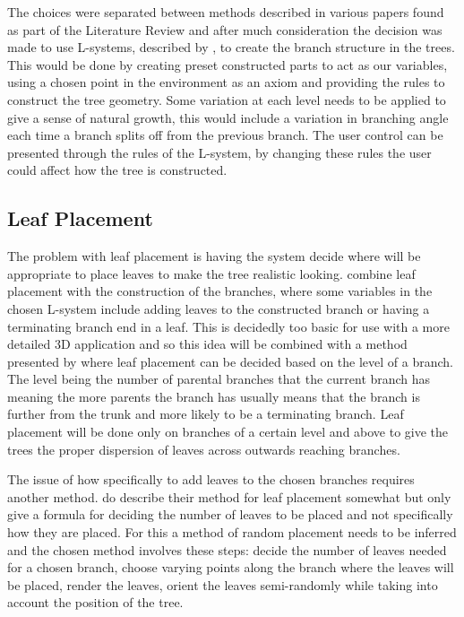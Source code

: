 \documentclass[progress]{cmpreport}
\begin{document}
The choices were separated between methods described in various papers found as part of the 
Literature Review and after much consideration the decision was made to use L-systems, 
described by \cite{prusinkiewicz1996systems}, to create the branch structure in the trees. 
This would be done by creating preset constructed parts to act as our variables, using a chosen 
point in the environment as an axiom and providing the rules to construct the tree geometry. 
Some variation at each level needs to be applied to give a sense of natural growth, this would 
include a variation in branching angle each time a branch splits off from the previous branch. 
The user control can be presented through the rules of the L-system, by changing these rules 
the user could affect how the tree is constructed.

\subsection{Leaf Placement}
The problem with leaf placement is having the system decide where will be appropriate to place 
leaves to make the tree realistic looking. \cite{prusinkiewicz1996systems} combine leaf 
placement with the construction of the branches, where some variables in the chosen L-system 
include adding leaves to the constructed branch or having a terminating branch end in a leaf. 
This is decidedly too basic for use with a more detailed 3D application and so this idea will 
be combined with a method presented by \cite{weber1995rendering} where leaf placement can be 
decided based on the level of a branch. The level being the number of parental branches that 
the current branch has meaning the more parents the branch has usually means that the branch 
is further from the trunk and more likely to be a terminating branch. Leaf placement will be 
done only on branches of a certain level and above to give the trees the proper dispersion of 
leaves across outwards reaching branches.

The issue of how specifically to add leaves to the chosen branches requires another method. 
\cite{weber1995rendering} do describe their method for leaf placement somewhat but only 
give a formula for deciding the number of leaves to be placed and not specifically how they 
are placed. For this a method of random placement needs to be inferred and the chosen method 
involves these steps: decide the number of leaves needed for a chosen branch, choose varying 
points along the branch where the leaves will be placed, render the leaves, orient the leaves 
semi-randomly while taking into account the position of the tree.
\end{document}
